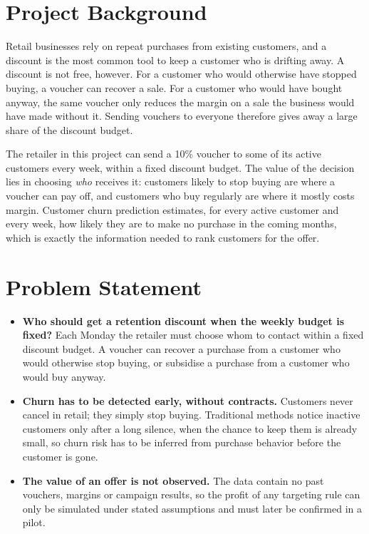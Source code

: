 \section{Project Background}
\label{sec:1-1}

Retail businesses rely on repeat purchases from existing customers, and a discount is the most common tool to keep a customer who is drifting away. A discount is not free, however. For a customer who would otherwise have stopped buying, a voucher can recover a sale. For a customer who would have bought anyway, the same voucher only reduces the margin on a sale the business would have made without it. Sending vouchers to everyone therefore gives away a large share of the discount budget.

The retailer in this project can send a 10\% voucher to some of its active customers every week, within a fixed discount budget. The value of the decision lies in choosing \emph{who} receives it: customers likely to stop buying are where a voucher can pay off, and customers who buy regularly are where it mostly costs margin. Customer churn prediction estimates, for every active customer and every week, how likely they are to make no purchase in the coming months, which is exactly the information needed to rank customers for the offer.

\section{Problem Statement}
\label{sec:1-2}

\begin{itemize}
    \item \textbf{Who should get a retention discount when the weekly budget is fixed?} Each Monday the retailer must choose whom to contact within a fixed discount budget. A voucher can recover a purchase from a customer who would otherwise stop buying, or subsidise a purchase from a customer who would buy anyway.
    \item \textbf{Churn has to be detected early, without contracts.} Customers never cancel in retail; they simply stop buying. Traditional methods notice inactive customers only after a long silence, when the chance to keep them is already small, so churn risk has to be inferred from purchase behavior before the customer is gone.
    \item \textbf{The value of an offer is not observed.} The data contain no past vouchers, margins or campaign results, so the profit of any targeting rule can only be simulated under stated assumptions and must later be confirmed in a pilot.
\end{itemize}

